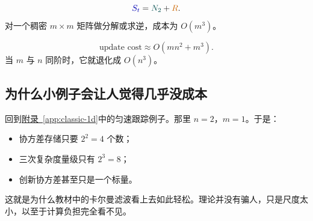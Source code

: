 \documentclass[12pt,a4paper]{ctexart}
\begin{document}
\[
\eqfocusa{S_t} = \eqfocusb{N_2} + \eqfocusc{R}.
\]
对一个稠密 \(m \times m\) 矩阵做分解或求逆，成本为 \(O(m^3)\)。

\[
\text{update cost} \approx O(m n^2 + m^3).
\]
当 \(m\) 与 \(n\) 同阶时，它就退化成 \(O(n^3)\)。

\subsection{为什么小例子会让人觉得几乎没成本}\label{app:derivation-small}

回到\hyperref[app:classic-1d]{附录~\ref*{app:classic-1d}}中的匀速跟踪例子。那里 \(n=2\)，\(m=1\)。于是：
\begin{itemize}
  \item 协方差存储只要 \(2^2 = 4\) 个数；
  \item 三次复杂度量级只有 \(2^3 = 8\)；
  \item 创新协方差甚至只是一个标量。
\end{itemize}

这就是为什么教材中的卡尔曼滤波看上去如此轻松。理论并没有骗人，只是尺度太小，以至于计算负担完全看不见。
\end{document}
